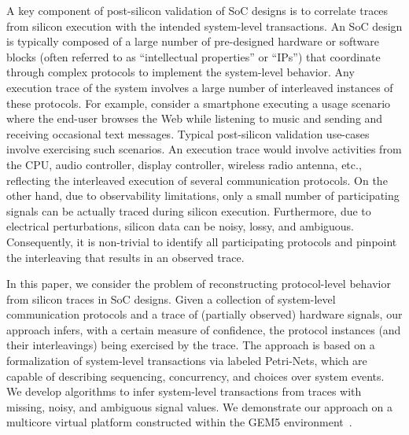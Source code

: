 \documentclass[conference]{IEEEtran}
\begin{document}
A key component of post-silicon validation of SoC designs is
to correlate traces from silicon execution with the intended
system-level transactions.  An SoC design is typically
composed of a large number of pre-designed hardware or
software blocks (often referred to as ``intellectual
properties'' or ``IPs'') that coordinate through complex
protocols to implement the system-level behavior.  Any
execution trace of the system involves a large number of
interleaved instances of these protocols.  For example,
consider a smartphone executing a usage scenario where the
end-user browses the Web while listening to music and
sending and receiving occasional text messages.  Typical
post-silicon validation use-cases involve exercising such
scenarios.  An execution trace would involve activities from
the CPU, audio controller, display controller, wireless
radio antenna, etc., reflecting the interleaved execution of
several communication protocols.  On the other hand, due to
observability limitations, only a small number of
participating signals can be actually traced during silicon
execution.  Furthermore, due to electrical perturbations,
silicon data can be noisy, lossy, and ambiguous.
Consequently, it is non-trivial to identify all
participating protocols and pinpoint the interleaving that
results in an observed trace.

In this paper, we consider the problem of reconstructing
protocol-level behavior from silicon traces in SoC designs.
Given a collection of system-level communication protocols
and a trace of (partially observed) hardware signals, our
approach infers, with a certain measure of confidence, the
protocol instances (and their interleavings) being exercised
by the trace.  The approach is based on a formalization of
system-level transactions via labeled Petri-Nets, which are
capable of describing sequencing, concurrency, and choices
over system events.  We develop algorithms to infer
system-level transactions from traces with missing, noisy,
and ambiguous signal values.  We demonstrate our approach on
a multicore virtual platform constructed within the GEM5
environment~\cite{Binkert2011}.
\end{document}
